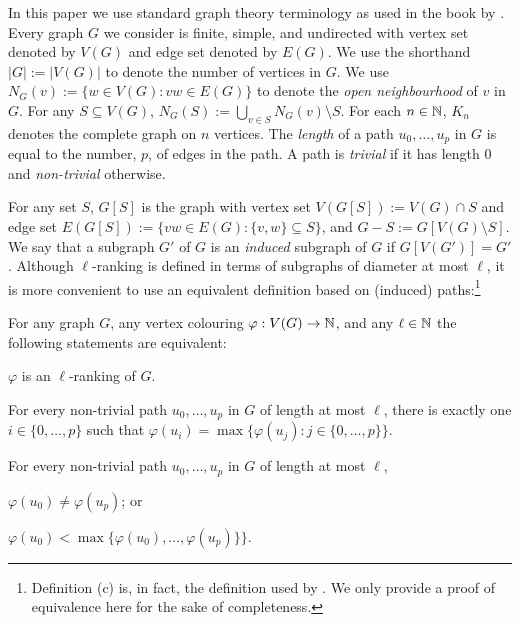 \documentclass[kpfonts]{patmorin}
\theoremstyle{named}
\begin{document}
In this paper we use standard graph theory terminology as used in the book by \citet{diestel:graph}.  Every graph $G$ we consider is finite, simple, and undirected with vertex set denoted by $V(G)$ and edge set denoted by $E(G)$.  We use the shorthand $|G|:=|V(G)|$ to denote the number of vertices in $G$.  We use $N_G(v):=\{w\in V(G): vw\in E(G)\}$ to denote the \emph{open neighbourhood} of $v$ in $G$. For any $S\subseteq V(G)$, $N_G(S):=\bigcup_{v\in S} N_G(v)\setminus S$.  For each $n\in\mathbb{N}$, $K_n$ denotes the complete graph on $n$ vertices.  The \emph{length} of a path $u_0,\ldots,u_p$ in $G$ is equal to the number, $p$, of edges in the path. A path is \emph{trivial} if it has length 0 and \emph{non-trivial} otherwise.

For any set $S$, $G[S]$ is the graph with vertex set $V(G[S]):=V(G)\cap S$ and edge set $E(G[S]):=\{vw\in E(G): \{v,w\}\subseteq S\}$, and $G-S:=G[V(G)\setminus S]$.  We say that a subgraph $G'$ of $G$ is an \emph{induced} subgraph of $G$ if $G[V(G')]=G'$.  Although $\ell$-ranking is defined in terms of subgraphs of diameter at most $\ell$, it is more convenient to use an equivalent definition based on (induced) paths:\footnote{Definition (c) is, in fact, the definition used by \citet{karpas.neiman.ea:on}. We only provide a proof of equivalence here for the sake of completeness.}

\begin{obs}
  For any graph $G$, any vertex colouring $\varphi:V(G)\to\mathbb{N}$, and any $\ell\in\mathbb{N}$ the following statements are equivalent:
  \begin{compactenum}[(a)]
    \item $\varphi$ is an $\ell$-ranking of $G$.
    \item For every non-trivial path $u_0,\ldots,u_p$ in $G$ of length at most $\ell$, there is exactly one $i\in\{0,\ldots,p\}$ such that $\varphi(u_i)=\max\{\varphi(u_j):j\in\{0,\ldots,p\}\}$.
    \item For every non-trivial path $u_0,\ldots,u_p$ in $G$ of length at most $\ell$,
  \begin{inparaenum}[(i)]
    \item $\varphi(u_0)\neq\varphi(u_p)$; or \item $\varphi(u_0)<\max\{\varphi(u_0),\ldots,\varphi(u_p)\}\}$.
  \end{inparaenum}
  \end{compactenum}
\end{obs}
\end{document}
